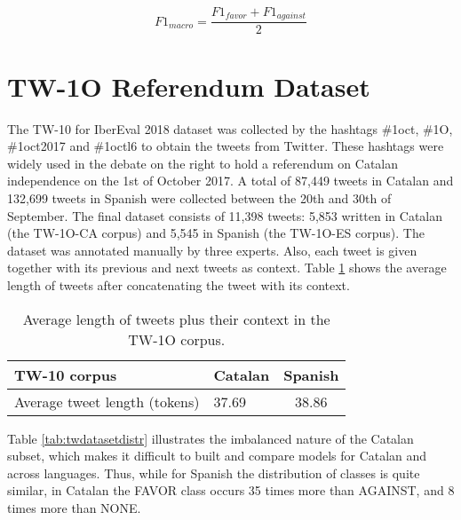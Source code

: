 \documentclass[10pt, a4paper]{article}
\begin{document}
\[F1_{macro} = \frac{F1_{favor} + F1_{against}}{2}\]

\section{TW-1O Referendum Dataset}\label{sec:tw1o_dataset}

The TW-10 for IberEval 2018 dataset was collected by the hashtags \#1oct, \#1O, \#1oct2017 and \#1octl6 to obtain the tweets from Twitter\cite{taule18}. These hashtags were widely used in the debate on the right to hold a referendum on Catalan independence on the 1st of October 2017. A total of 87,449 tweets in Catalan and 132,699 tweets in Spanish were collected between the 20th and 30th of September. The final dataset consists of 11,398 tweets: 5,853 written in Catalan (the TW-1O-CA corpus) and 5,545 in Spanish (the TW-1O-ES corpus). The dataset was annotated manually by three experts. Also, each tweet is given together with its previous and next tweets as context. Table \ref{tab:length_tw_dataset} shows the average length of tweets after concatenating the tweet with its context.

\begin{table}[!ht]
\begin{tabular}{llc} \hline
  TW-10 corpus & Catalan & Spanish \\ \hline
  Average tweet length (tokens) & 37.69 & 38.86\\ \hline
\end{tabular}
\caption{Average length of tweets plus their context in the TW-1O corpus.}\label{tab:length_tw_dataset}
\end{table}







Table \ref{tab:twdatasetdistr} illustrates the imbalanced nature of the Catalan subset, which makes it difficult to built and compare models for Catalan and across languages. Thus, while for Spanish the distribution of classes is quite similar, in Catalan the FAVOR class occurs 35 times more than AGAINST, and 8 times more than NONE.
\end{document}
